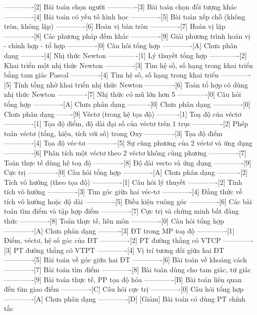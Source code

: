 -------------[2] Bài toán chọn người
-------------[3] Bài toán chọn đối tượng khác
-------------[4] Bài toán có yếu tố hình học
-------------[5] Bài toán xếp chỗ (không tròn, không lặp)
-------------[6] Hoán vị bàn tròn
-------------[7] Hoán vị lặp
-------------[8] Các phương pháp đếm khác
-------------[9] Giải phương trình hoán vị - chỉnh hợp -  tổ hợp
-------------[0] Câu hỏi tổng hợp
-------------[A] Chưa phân dạng
----------[4] Nhị thức Newton
-------------[1] Lý thuyết tổng hợp 
-------------[2] Khai triển một nhị thức Newton
-------------[3] Tìm hệ số, số hạng trong khai triển bằng tam giác Pascal
-------------[4] Tìm hệ số, số hạng trong khai triển
-------------[5] Tính tổng nhờ khai triển nhị thức Newton
-------------[6] Toán tổ hợp có dùng nhị thức Newton
-------------[7] Nhị thức có mũ lớn hơn 5
-------------[0] Câu hỏi tổng hợp
-------------[A] Chưa phân dạng
----------[0] Chưa phân dạng
-------------[0] Chưa phân dạng
-------[9] Véctơ (trong hệ tọa độ)
----------[1] Toạ độ của véctơ
-------------[1] Tọa độ điểm, độ dài đại số của véctơ trên 1 trục
-------------[2] Phép toán véctơ (tổng, hiệu, tích với số) trong Oxy
-------------[3] Tọa độ điểm 
-------------[4] Tọa độ véc-tơ
-------------[5] Sự cùng phương của 2 véctơ và ứng dụng
-------------[6] Phân tích một véctơ theo 2 véctơ không cùng phương
-------------[7] Toán thực tế dùng hệ toạ độ
-------------[8] Độ dài vecto và ứng dụng
-------------[9] Cực trị
-------------[0] Câu hỏi tổng hợp
-------------[A] Chưa phân dạng
----------[2] Tích vô hướng (theo tọa độ)
-------------[1] Câu hỏi lý thuyết
-------------[2] Tính tích vô hướng
-------------[3] Tìm góc giữa hai véc-tơ
-------------[4] Đẳng thức về tích vô hướng hoặc độ dài
-------------[5] Điều kiện vuông góc
-------------[6] Các bài toán tìm điểm và tập hợp điểm
-------------[7] Cực trị và chứng minh bất đẳng thức
-------------[8] Toán thực tế, liên môn
-------------[0] Câu hỏi tổng hợp
-------------[A] Chưa phân dạng
----------[3] ĐT trong MP toạ độ
-------------[1] Điểm, véctơ, hệ số góc của ĐT
-------------[2] PT đường thẳng có VTCP
-------------[3] PT đường thẳng có VTPT
-------------[4] Vị trí tương đối giữa hai ĐT
-------------[5] Bài toán về góc giữa hai ĐT
-------------[6] Bài toán về khoảng cách
-------------[7] Bài toán tìm điểm
-------------[8] Bài toán dùng cho tam giác, tứ giác
-------------[9] Bài toán thực tế, PP tọa độ hóa
-------------[B] Bài toán liên quan đến tìm giao điểm
-------------[C] Câu hỏi cực trị
-------------[0] Câu hỏi tổng hợp
-------------[A] Chưa phân dạng
-------------[D] [Giảm] Bài toán có dùng PT chính tắc
